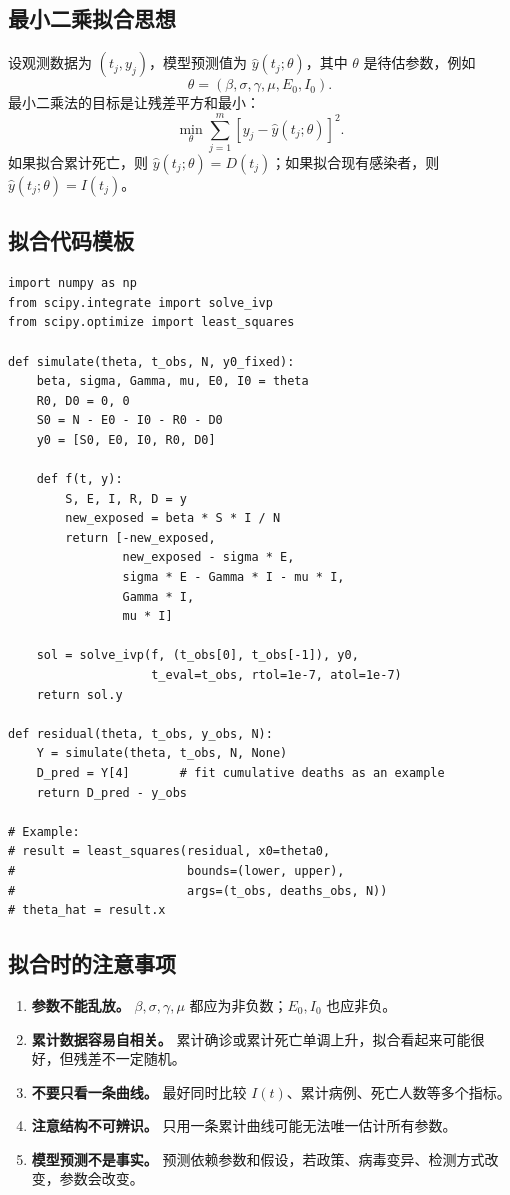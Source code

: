 \documentclass[UTF8,12pt,a4paper]{ctexart}
\begin{document}
\subsection{最小二乘拟合思想}
设观测数据为 $(t_j,y_j)$，模型预测值为 $\hat y(t_j;\theta)$，其中 $\theta$ 是待估参数，例如
\[
\theta=(\beta,\sigma,\gamma,\mu,E_0,I_0).
\]
最小二乘法的目标是让残差平方和最小：
\[
\min_{\theta}\sum_{j=1}^m\left[y_j-\hat y(t_j;\theta)\right]^2.
\]
如果拟合累计死亡，则 $\hat y(t_j;\theta)=D(t_j)$；如果拟合现有感染者，则 $\hat y(t_j;\theta)=I(t_j)$。

\subsection{拟合代码模板}
\begin{lstlisting}
import numpy as np
from scipy.integrate import solve_ivp
from scipy.optimize import least_squares

def simulate(theta, t_obs, N, y0_fixed):
    beta, sigma, Gamma, mu, E0, I0 = theta
    R0, D0 = 0, 0
    S0 = N - E0 - I0 - R0 - D0
    y0 = [S0, E0, I0, R0, D0]

    def f(t, y):
        S, E, I, R, D = y
        new_exposed = beta * S * I / N
        return [-new_exposed,
                new_exposed - sigma * E,
                sigma * E - Gamma * I - mu * I,
                Gamma * I,
                mu * I]

    sol = solve_ivp(f, (t_obs[0], t_obs[-1]), y0,
                    t_eval=t_obs, rtol=1e-7, atol=1e-7)
    return sol.y

def residual(theta, t_obs, y_obs, N):
    Y = simulate(theta, t_obs, N, None)
    D_pred = Y[4]       # fit cumulative deaths as an example
    return D_pred - y_obs

# Example:
# result = least_squares(residual, x0=theta0,
#                        bounds=(lower, upper),
#                        args=(t_obs, deaths_obs, N))
# theta_hat = result.x
\end{lstlisting}

\subsection{拟合时的注意事项}
\begin{enumerate}[label=\arabic*.]
\item \textbf{参数不能乱放。} $\beta,\sigma,\gamma,\mu$ 都应为非负数；$E_0,I_0$ 也应非负。
\item \textbf{累计数据容易自相关。} 累计确诊或累计死亡单调上升，拟合看起来可能很好，但残差不一定随机。
\item \textbf{不要只看一条曲线。} 最好同时比较 $I(t)$、累计病例、死亡人数等多个指标。
\item \textbf{注意结构不可辨识。} 只用一条累计曲线可能无法唯一估计所有参数。
\item \textbf{模型预测不是事实。} 预测依赖参数和假设，若政策、病毒变异、检测方式改变，参数会改变。
\end{enumerate}
\end{document}
